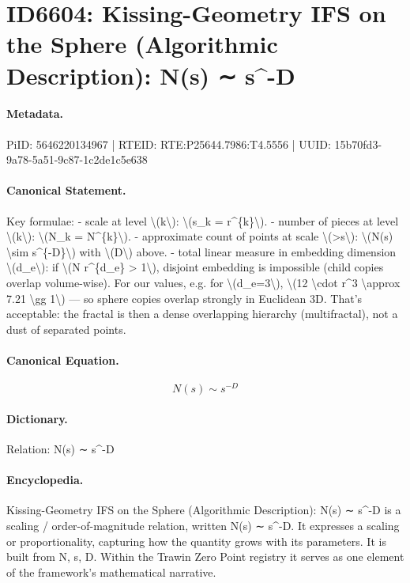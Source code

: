\section*{ID6604: Kissing-Geometry IFS on the Sphere (Algorithmic Description): N(s) ∼ s\textasciicircum{}-D}
\paragraph{Metadata.}
PiID: 5646220134967 | RTEID: RTE:P25644.7986:T4.5556 | UUID: 15b70fd3-9a78-5a51-9c87-1c2de1c5e638

\paragraph{Canonical Statement.}
Key formulae: - scale at level \textbackslash{}(k\textbackslash{}): \textbackslash{}(s\_k = r\textasciicircum{}\{k\}\textbackslash{}). - number of pieces at level \textbackslash{}(k\textbackslash{}): \textbackslash{}(N\_k = N\textasciicircum{}\{k\}\textbackslash{}). - approximate count of points at scale \textbackslash{}(>s\textbackslash{}): \textbackslash{}(N(s) \textbackslash{}sim s\textasciicircum{}\{-D\}\textbackslash{}) with \textbackslash{}(D\textbackslash{}) above. - total linear measure in embedding dimension \textbackslash{}(d\_e\textbackslash{}): if \textbackslash{}(N r\textasciicircum{}\{d\_e\} > 1\textbackslash{}), disjoint embedding is impossible (child copies overlap volume-wise). For our values, e.g. for \textbackslash{}(d\_e=3\textbackslash{}), \textbackslash{}(12 \textbackslash{}cdot r\textasciicircum{}3 \textbackslash{}approx 7.21 \textbackslash{}gg 1\textbackslash{}) — so sphere copies overlap strongly in Euclidean 3D. That’s acceptable: the fractal is then a dense overlapping hierarchy (multifractal), not a dust of separated points.

\paragraph{Canonical Equation.}
\[
N(s) \sim s^{-D}
\]

\paragraph{Dictionary.}
Relation: N(s) ∼ s\textasciicircum{}-D

\paragraph{Encyclopedia.}
Kissing-Geometry IFS on the Sphere (Algorithmic Description): N(s) ∼ s\textasciicircum{}-D is a scaling / order-of-magnitude relation, written N(s) ∼ s\textasciicircum{}-D. It expresses a scaling or proportionality, capturing how the quantity grows with its parameters. It is built from N, s, D. Within the Trawin Zero Point registry it serves as one element of the framework's mathematical narrative.
